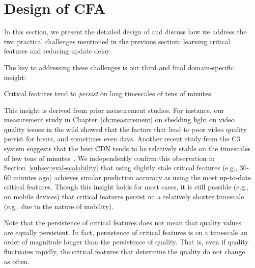 \section{Design of CFA}
\label{sec:cfa:design}

In this section, we present the detailed design of \dda 
and discuss how we address the two practical challenges 
mentioned in the previous section: learning critical features 
and reducing update delay.

The key  to addressing these challenges
 is our third and final domain-specific insight:

\begin{insight}
\vspace{0.1cm}
Critical features tend to {\em persist} on long timescales
of tens of minutes.
\vspace{-0.2cm}
\label{insight:persistence}
\end{insight}

 This insight is derived from prior measurement 
 studies.
 For instance, our measurement study in 
 Chapter~\ref{ch:measurement} 
 on shedding light on video quality issues in the wild showed 
 that the factors that lead to poor video quality persist
 for hours, and sometimes even days.  
 Another recent study from the C3 system suggests that 
 the best CDN tends to be relatively stable on the 
 timescales of few tens of minutes~\cite{c3}.  
We independently confirm this observation in 
Section~\ref{subsec:eval-scalability} that 
using slightly stale critical features (e.g., 30-60 minutes 
 ago) achieves similar prediction accuracy as using the 
most up-to-date critical features.
Though this insight holds for most cases, it is still possible
(e.g., on mobile devices) that critical features persist on a 
relatively shorter timescale (e.g., due to the nature of 
mobility).



Note that the persistence of critical features does not 
mean that quality values are equally persistent.  
In fact, persistence of critical features is on a 
timescale an order of magnitude longer than 
the persistence of quality.  
That is, even if quality fluctuates rapidly, the critical 
features that determine the quality do not change 
as often.


